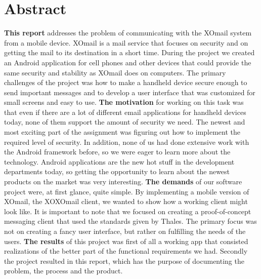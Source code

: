 
\chapter*{Abstract}

\textbf{This report} addresses the problem of communicating with the XOmail system from a mobile device. XOmail is a mail service that focuses on security and on getting the mail to its destination in a short time. During the project we created an Android application for cell phones and other devices that could provide the same security and stability as XOmail does on computers. The primary challenges of the project was how to make a handheld device secure enough to send important messages and to develop a user interface that was customized for small screens and easy to use. 
\newline
\newline
\textbf{The motivation} for working on this task was that even if there are a lot of different email applications for handheld devices today, none of them support the amount of security we need. The newest and most exciting part of the assignment was figuring out how to implement the required level of security. In addition, none of us had done extensive work with the Android framework before, so we were eager to learn more about the technology. Android applications are the new hot stuff in the development departments today, so getting the opportunity to learn about the newest products on the market was very interesting. 
\newline
\newline
\textbf{The demands} of our software project were, at first glance, quite simple. By implementing a mobile version of XOmail, the XOXOmail client, we wanted to show how a working client might look like. It is important to note that we focused on creating a proof-of-concept messaging client that used the standards given by Thales. The primary focus was not on creating a fancy user interface, but rather on fulfilling the needs of the users. 
\newline
\newline
\textbf{The results} of this project was first of all a working app that consisted realizations of the better part of the functional requirements we had. Secondly the project resulted in this report, which has the purpose of documenting the problem, the process and the product.

